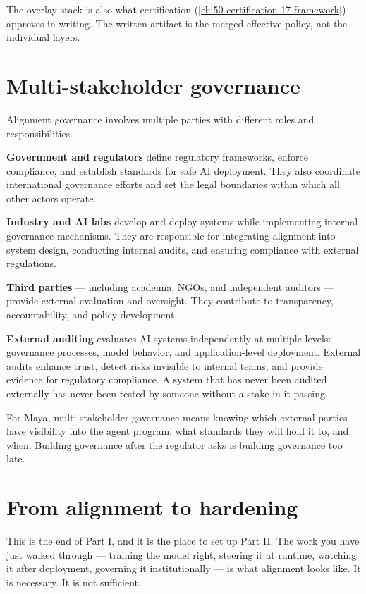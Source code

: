 The overlay stack is also what certification (\autoref{ch:50-certification-17-framework}) approves in writing. The written artifact is the merged effective policy, not the individual layers.

\section{Multi-stakeholder governance}

Alignment governance involves multiple parties with different roles and responsibilities.

\textbf{Government and regulators} define regulatory frameworks, enforce compliance, and establish standards for safe AI deployment. They also coordinate international governance efforts and set the legal boundaries within which all other actors operate.

\textbf{Industry and AI labs} develop and deploy systems while implementing internal governance mechanisms. They are responsible for integrating alignment into system design, conducting internal audits, and ensuring compliance with external regulations.

\textbf{Third parties} --- including academia, NGOs, and independent auditors --- provide external evaluation and oversight. They contribute to transparency, accountability, and policy development.

\textbf{External auditing} evaluates AI systems independently at multiple levels: governance processes, model behavior, and application-level deployment. External audits enhance trust, detect risks invisible to internal teams, and provide evidence for regulatory compliance. A system that has never been audited externally has never been tested by someone without a stake in it passing.

For Maya, multi-stakeholder governance means knowing which external parties have visibility into the agent program, what standards they will hold it to, and when. Building governance after the regulator asks is building governance too late.

\section{From alignment to hardening}

This is the end of Part I, and it is the place to set up Part II. The work you have just walked through --- training the model right, steering it at runtime, watching it after deployment, governing it institutionally --- is what alignment looks like. It is necessary. It is not sufficient.

